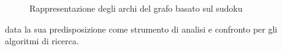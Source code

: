 \begin{itemize}
\begin{figure}[H]
        \caption{Rappresentazione degli archi del grafo basato sul sudoku}
        \label{fig:sudoku2d3d}%
    \end{figure}
    data la sua predisposizione come strumento di analisi e confronto per gli algoritmi di ricerca.
\end{itemize}
